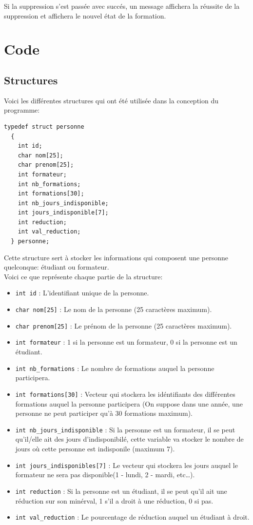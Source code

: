 \documentclass[11pt]{article}
\begin{document}
Si la suppression s'est passée avec succés, un message affichera la réussite de la suppression et affichera le nouvel état de la formation.

\newpage
\section{Code}
\subsection{Structures}
Voici les différentes structures qui ont été utilisée dans la conception du programme:

\begin{lstlisting}[firstnumber=30]
  typedef struct personne
  {
    int id;
    char nom[25];
    char prenom[25];
    int formateur;
    int nb_formations;
    int formations[30];
    int nb_jours_indisponible;
    int jours_indisponible[7];
    int reduction;
    int val_reduction;
  } personne;
\end{lstlisting}

Cette structure sert à stocker les informations qui composent une personne quelconque: étudiant ou formateur.\\
Voici ce que représente chaque partie de la structure:
\begin{itemize}
\item \texttt{int id} : L'identifiant unique de la personne.
\item \texttt{char nom[25]} : Le nom de la personne (25 caractères maximum).
\item \texttt{char prenom[25]} : Le prénom de la personne (25 caractères maximum).
\item \texttt{int formateur} : 1 si la personne est un formateur, 0 si la personne est un étudiant.
\item \texttt{int nb\_formations} : Le nombre de formations auquel la personne participera.
\item \texttt{int formations[30]} : Vecteur qui stockera les idéntifiants des différentes formations auquel la personne participera (On suppose dans une année, une personne ne peut participer qu'à 30 formations maximum).
\item \texttt{int nb\_jours\_indisponible} : Si la personne est un formateur, il se peut qu'il/elle ait des jours d'indisponibilé, cette variable va stocker le nombre de jours où cette personne est indisponile (maximum 7).
\item \texttt{int jours\_indisponibles[7]} : Le vecteur qui stockera les jours auquel le formateur ne sera pas disponible(1 - lundi, 2 - mardi, etc\ldots).
\item \texttt{int reduction} : Si la personne est un étudiant, il se peut qu'il ait une réduction sur son minérval, 1 s'il a droit à une réduction, 0 si pas.
\item \texttt{int val\_reduction} : Le pourcentage de réduction auquel un étudiant à droit.
\end{itemize}
\end{document}
